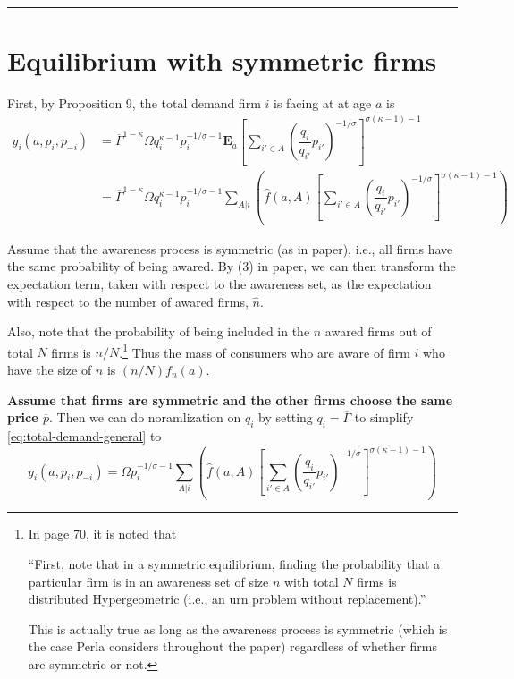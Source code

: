 \documentclass[12pt]{article}
\newcommand{\E}{\mathbf{E}}
\theoremstyle{definition}
\begin{document}
	

 \\ 
\noindent\rule{\textwidth}{.1mm}
\section{Equilibrium with symmetric firms}
First, by Proposition 9, the total demand firm $i$ is facing at at age $a$ is 
\begin{align}
y_i(a, p_i, p_{-i}) &= \overline{\Gamma}^{1 - \kappa} \Omega q_i^{\kappa-1} p_i^{-1/\sigma-1} \E_a  \left[ \sum_{i' \in A} \left( \dfrac{q_i}{q_{i'}} p_{i'} \right)^{-1/\sigma}  \right]^{\sigma(\kappa-1) -1} \\
&= \overline{\Gamma}^{1 - \kappa} \Omega q_i^{\kappa-1} p_i^{-1/\sigma-1} \sum_{A | i } \left( \widehat f (a, A) \left[ \sum_{i' \in A} \left( \dfrac{q_i}{q_{i'}} p_{i'} \right)^{-1/\sigma}  \right]^{\sigma(\kappa-1) -1} \right) \label{eq:total-demand-general}
\end{align}

Assume that the awareness process is symmetric (as in paper), i.e., all firms have the same probability of being awared. By (3) in paper, we can then transform the expectation term, taken with respect to the awareness set, as the expectation with respect to the number of awared firms, $\widehat n$. 

Also, note that the probability of being included in the $n$ awared firms out of total $N$ firms is $n/N$.\footnote{In page 70, it is noted that 
	
	``First, note that in a symmetric equilibrium, finding the probability that a particular firm is in an awareness set of size $n$ with total $N$ firms is distributed Hypergeometric (i.e., an urn	problem without replacement).''
	
	This is actually true as long as the awareness process is symmetric (which is the case Perla considers throughout the paper) regardless of whether firms are symmetric or not.} Thus the mass of consumers who are aware of firm $i$ who have the size of $n$ is $(n/N )f_n(a)$. 

\textbf{Assume that firms are symmetric and the other firms choose the same price $\overline p$}. Then we can do noramlization on $q_i$ by setting $q_i = \overline{\Gamma}$ to simplify \autoref{eq:total-demand-general} to 
\begin{equation}\label{eq:total-demand-general-simple}
y_i(a, p_i, p_{-i}) = \Omega  p_i^{-1/\sigma-1} \sum_{A | i } \left( \widehat f (a, A) \left[ \sum_{i' \in A} \left( \dfrac{q_i}{q_{i'}} p_{i'} \right)^{-1/\sigma}  \right]^{\sigma(\kappa-1) -1} \right)
\end{equation}
\end{document}
